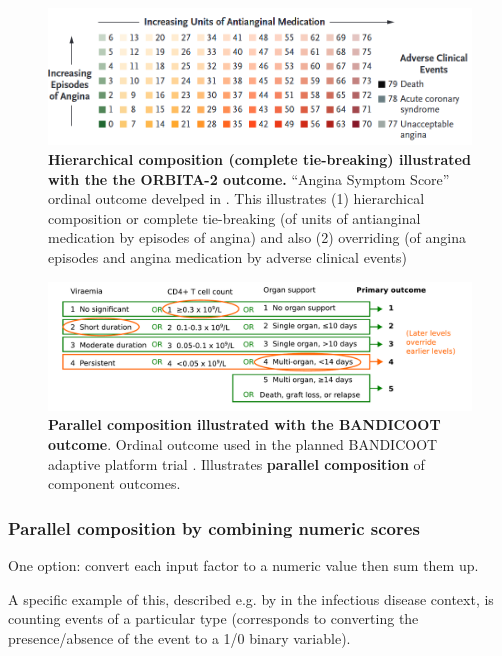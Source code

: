 \documentclass[
  11pt,
  fleqn
]{article}
\begin{document}
\begin{figure}
  \includegraphics[width=6in]{rajkumar_et_al_outcome.png}
  \caption{\textbf{Hierarchical composition (complete tie-breaking)
      illustrated with the
    the ORBITA-2 outcome.} ``Angina
    Symptom Score'' ordinal outcome develped in
    \citep{rajkumarPlaceboControlledTrialPercutaneous2023}. This illustrates
    (1) hierarchical composition or complete tie-breaking (of units
      of antianginal medication by
    episodes of angina) and also (2) overriding (of angina episodes and
  angina medication by adverse clinical events)}
  \label{fig:rajkumar_et_al_outcome}
\end{figure}

\begin{figure}
  \includegraphics[width=7in]{parallel_composition_bandicoot.pdf}
  \caption{\textbf{Parallel composition illustrated with the
    BANDICOOT outcome}.
    Ordinal outcome used in the planned BANDICOOT adaptive platform trial
    \citep{walkerCodesigningNovelOrdinal2025}. Illustrates \textbf{parallel
  composition} of component outcomes.} \label{fig:parallel_bandicoot}
\end{figure}

\subsubsection{Parallel composition by combining numeric scores}

One option: convert each input factor to a numeric value then sum them up.

A specific example of this, described e.g. by
\citet{ongUnlockingDOORHow2023} in
the infectious disease context, is counting events of a particular
type (corresponds to converting the presence/absence of the event to
a 1/0 binary variable).
\end{document}
